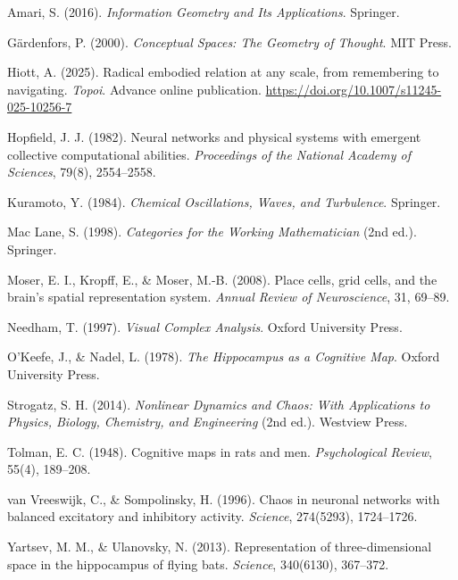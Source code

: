 \documentclass[11pt, a4paper]{article}
\theoremstyle{plain}
\theoremstyle{definition}
\theoremstyle{remark}
\begin{document}
\begin{description}[leftmargin=2em, itemsep=0.5em]

\item Amari, S. (2016). \textit{Information Geometry and Its Applications}. Springer.

\item Gärdenfors, P. (2000). \textit{Conceptual Spaces: The Geometry of Thought}.
MIT Press.

\item Hiott, A. (2025). Radical embodied relation at any scale, from remembering
to navigating. \textit{Topoi}. Advance online publication.
\href{https://doi.org/10.1007/s11245-025-10256-7}{https://doi.org/10.1007/s11245-025-10256-7}

\item Hopfield, J. J. (1982). Neural networks and physical systems with emergent
collective computational abilities. \textit{Proceedings of the National Academy of
Sciences}, 79(8), 2554--2558.

\item Kuramoto, Y. (1984). \textit{Chemical Oscillations, Waves, and Turbulence}.
Springer.

\item Mac Lane, S. (1998). \textit{Categories for the Working Mathematician} (2nd ed.).
Springer.

\item Moser, E. I., Kropff, E., \& Moser, M.-B. (2008). Place cells, grid cells, and
the brain's spatial representation system. \textit{Annual Review of Neuroscience},
31, 69--89.

\item Needham, T. (1997). \textit{Visual Complex Analysis}. Oxford University Press.

\item O'Keefe, J., \& Nadel, L. (1978). \textit{The Hippocampus as a Cognitive Map}.
Oxford University Press.

\item Strogatz, S. H. (2014). \textit{Nonlinear Dynamics and Chaos: With Applications
to Physics, Biology, Chemistry, and Engineering} (2nd ed.). Westview Press.

\item Tolman, E. C. (1948). Cognitive maps in rats and men. \textit{Psychological
Review}, 55(4), 189--208.

\item van Vreeswijk, C., \& Sompolinsky, H. (1996). Chaos in neuronal networks with
balanced excitatory and inhibitory activity. \textit{Science}, 274(5293), 1724--1726.

\item Yartsev, M. M., \& Ulanovsky, N. (2013). Representation of three-dimensional
space in the hippocampus of flying bats. \textit{Science}, 340(6130), 367--372.

\end{description}
\end{document}
